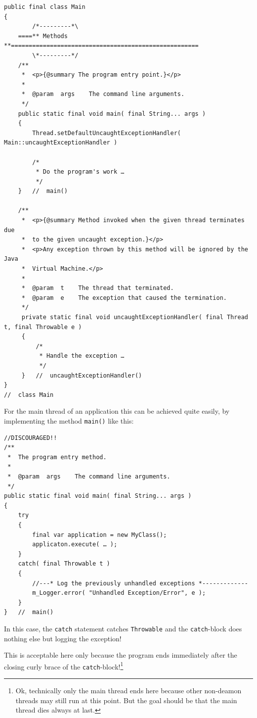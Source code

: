 \begin{lstlisting}
public final class Main
{
        /*---------*\
    ====** Methods **=====================================================
        \*---------*/
    /**
     *  <p>{@summary The program entry point.}</p>
     *
     *  @param  args    The command line arguments.
     */
    public static final void main( final String... args )
    {
        Thread.setDefaultUncaughtExceptionHandler( Main::uncaughtExceptionHandler )
    
        /*
         * Do the program's work …
         */
    }   //  main()
    
    /**
     *  <p>{@summary Method invoked when the given thread terminates due 
     *  to the given uncaught exception.}</p>
     *  <p>Any exception thrown by this method will be ignored by the Java
     *  Virtual Machine.</p>
     *
     *  @param  t    The thread that terminated.
     *  @param  e    The exception that caused the termination.
     */
     private static final void uncaughtExceptionHandler( final Thread t, final Throwable e )
     {
         /*
          * Handle the exception …
          */
     }   //  uncaughtExceptionHandler()
}
//  class Main
\end{lstlisting}



For the main thread of an application this can be achieved quite easily, by implementing the method \lstinline|main()| like this:
\begin{lstlisting}
//DISCOURAGED!!
/**
 *  The program entry method.
 *
 *  @param  args    The command line arguments.
 */
public static final void main( final String... args )
{
    try
    {
        final var application = new MyClass();
        applicaton.execute( … );
    }
    catch( final Throwable t )
    {
        //---* Log the previously unhandled exceptions *-------------
        m_Logger.error( "Unhandled Exception/Error", e );
    }
}   //  main()
\end{lstlisting}
In this case, the \lstinline|catch| statement catches \lstinline|Throwable| and the 
\lstinline|catch|-block does nothing else but logging the exception!

This is acceptable here only because the program ends immediately after the closing curly brace of the \lstinline|catch|-block!\footnote{Ok, technically only the main thread ends here because other non-deamon threads may still run at this point. But the goal should be that the main thread dies always at last.}


